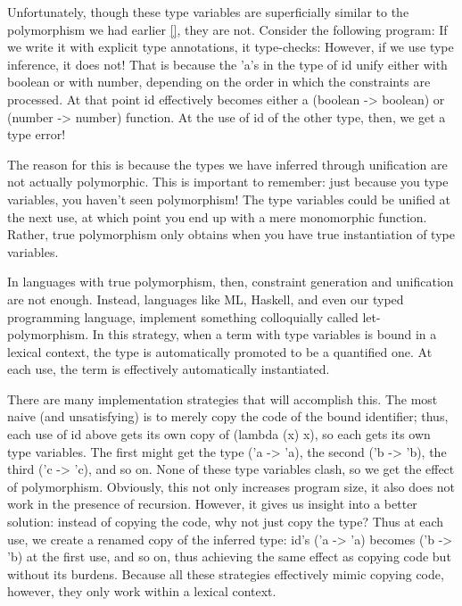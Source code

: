 
Unfortunately, though these type variables are superficially similar to the
polymorphism we had earlier \ref{}, they are not. Consider the following
program:
If we write it with explicit type annotations, it type-checks:
However, if we use type inference, it does not! That is because the 'a’s in the
type of id unify either with boolean or with number, depending on the order in
which the constraints are processed. At that point id effectively becomes either
a (boolean -> boolean) or (number -> number) function. At the use of id of the
other type, then, we get a type error!

The reason for this is because the types we have inferred through unification
are not actually polymorphic. This is important to remember: just because you
type variables, you haven’t seen polymorphism! The type variables could be
unified at the next use, at which point you end up with a mere monomorphic
function. Rather, true polymorphism only obtains when you have true
instantiation of type variables.

In languages with true polymorphism, then, constraint generation and unification
are not enough. Instead, languages like ML, Haskell, and even our typed
programming language, implement something colloquially called let-polymorphism.
In this strategy, when a term with type variables is bound in a lexical context,
the type is automatically promoted to be a quantified one. At each use, the term
is effectively automatically instantiated.

There are many implementation strategies that will accomplish this. The most
naive (and unsatisfying) is to merely copy the code of the bound identifier;
thus, each use of id above gets its own copy of (lambda (x) x), so each gets its
own type variables. The first might get the type ('a -> 'a), the second ('b ->
'b), the third ('c -> 'c), and so on. None of these type variables clash, so we
get the effect of polymorphism. Obviously, this not only increases program size,
it also does not work in the presence of recursion. However, it gives us insight
into a better solution: instead of copying the code, why not just copy the type?
Thus at each use, we create a renamed copy of the inferred type: id’s ('a -> 'a)
becomes ('b -> 'b) at the first use, and so on, thus achieving the same effect
as copying code but without its burdens. Because all these strategies
effectively mimic copying code, however, they only work within a lexical
context.

\secup